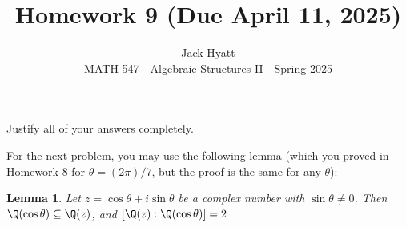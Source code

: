 \documentclass[12pt]{article}
\newtheorem{lemma}[theorem]{Lemma}
\begin{document}
	
	
	
	\title{Homework 9 (Due April 11, 2025)}
	\author{Jack Hyatt\\ %
		MATH 547 - Algebraic Structures II - Spring 2025} 
	
	\maketitle
	
	Justify all of your answers completely.\\
	
	
	\medskip 
	
	
	For the next problem, you may use the following lemma (which you
	proved in Homework 8 for $\theta = (2\pi)/7$, but the proof is the same for any $\theta$):
	\begin{lemma}
		Let $z = \cos\theta + i\sin\theta$ be a complex number with $\sin\theta \neq 0$. Then $\Q(\cos\theta) \subseteq \Q(z)$, and $[\Q(z) : \Q(\cos\theta)] = 2$
	\end{lemma}
\end{document}
